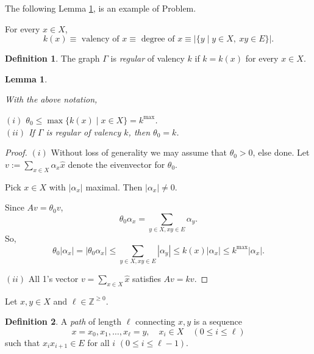 \documentclass[
]{book}
\newtheorem{lemma}{Lemma}[chapter]
\theoremstyle{definition}
\newtheorem{definition}{Definition}[chapter]
\theoremstyle{definition}
\theoremstyle{definition}
\theoremstyle{definition}
\theoremstyle{remark}
\begin{document}
The following Lemma \ref{lem:largestev}, is an example of Problem.

For every \(x\in X\),
\[k(x) \equiv \textrm{ valency of }x \equiv \textrm{ degree of }x \equiv |\{y\mid y\in X, \: xy\in E\}|.\]

\begin{definition}
\protect\hypertarget{def:regular}{}\label{def:regular}The graph \(\Gamma\) is \emph{regular} of valency \(k\) if \(k = k(x)\) for every \(x\in X\).
\end{definition}

\begin{lemma}
\protect\hypertarget{lem:largestev}{}\label{lem:largestev}

With the above notation,

\((i)\) \(\theta_0\leq \max\{k(x) \mid x\in X\} = k^{\max}\).\\
\((ii)\) If \(\Gamma\) is regular of valency \(k\), then \(\theta_0 = k\).

\end{lemma}

\hfill\break

\begin{proof}

\((i)\) Without loss of generality we may assume that \(\theta_0>0\), else done. Let \(v:=\sum_{x\in X}\alpha_x\hat{x}\) denote the eivenvector for \(\theta_0\).

Pick \(x\in X\) with \(|\alpha_x|\) maximal. Then \(|\alpha_x|\neq 0\).

Since \(Av = \theta_0v\),
\[\theta_0\alpha_x = \sum_{y\in X, xy\in E}\alpha_y.\]
So,
\[\theta_0 |\alpha_x| = |\theta_0\alpha_x| \leq \sum_{y\in X, xy\in E}|\alpha_y| \leq k(x)|\alpha_x| \leq k^{\max}|\alpha_x|.\]

\((ii)\) All 1's vector \(v = \sum_{x\in X}\hat{x}\) satisfies \(Av = kv\).

\end{proof}

\hfill\break

Let \(x, y\in X\) and \(\ell \in \mathbb{Z}^{\geq 0}\).

\begin{definition}
\protect\hypertarget{def:path}{}\label{def:path}A \emph{path} of length \(\ell\) connecting \(x, y\) is a sequence
\[x = x_0, x_1, \ldots, x_{\ell} = y, \quad x_i\in X \quad (0\leq i\leq \ell)\]
such that \(x_ix_{i+1}\in E\) for all \(i\) \((0\leq i \leq \ell-1)\).
\end{definition}
\end{document}
